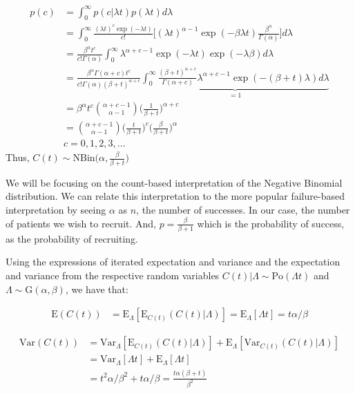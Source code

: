 \begin{align*}
p(c)&=\int^\infty_0 p(c|\lambda t) p(\lambda t) d\lambda\\
&=\int^\infty_0 \frac{(\lambda t)^c\exp(-\lambda t)}{c!}\Bigg[(\lambda t)^{\alpha-1}\exp(-\beta\lambda t)\frac{\beta^\alpha}{\Gamma(\alpha)}\Bigg]d\lambda\\
&=\frac{\beta^\alpha t^c}{c!\Gamma(\alpha)}\int^\infty_0 \lambda^{\alpha+c-1}\exp(-\lambda t)\exp(-\lambda\beta)d\lambda\\
&=\frac{\beta^\alpha\Gamma(\alpha+c) t^c}{c!\Gamma(\alpha) (\beta+t)^{\alpha+c}}\underbrace{\int^\infty_0 \frac{(\beta+t)^{\alpha+c}}{\Gamma(\alpha+c)} \lambda^{\alpha+c-1}\exp(-(\beta+t)\lambda)d\lambda}_{=1}\\
&=\beta^\alpha t^c\binom{\alpha+c-1}{\alpha-1}\Bigg (\frac{1}{\beta+t}\Bigg)^{\alpha+c}\\
&=\binom{\alpha+c-1}{\alpha-1}\Bigg (\frac{t}{\beta+t}\Bigg)^{c} \Bigg(\frac{\beta}{\beta+t}\Bigg)^{\alpha}\\
& c = 0,1,2,3,\ldots
\end{align*}
Thus, $C(t)\sim \textrm{NBin} \Bigg(\alpha, \frac{\beta}{\beta+t}\Bigg)$

We will be focusing on the count-based interpretation of the Negative Binomial distribution. We can relate this interpretation to the more popular failure-based interpretation by seeing $\alpha$ as $n$, the number of successes. In our case, the number of patients we wish to recruit. And, $p = \frac{\beta}{\beta+1}$ which is the probability of success, as the probability of recruiting.


Using the expressions of iterated expectation and variance \citep{held2014applied} and the expectation and variance from the respective random variables $C(t)|\Lambda \sim \textrm{Po}(\Lambda t)$ and $\Lambda \sim \textrm{G}(\alpha,\beta)$, we have that:


\begin{align*}
\textrm{E}(C(t)) &= \textrm{E}_{\Lambda}[\textrm{E}_{C(t)} (C(t)|\Lambda)] = \textrm{E}_{\Lambda}[\Lambda t] = t\alpha/\beta
\end{align*}

\begin{align*}
\textrm{Var}(C(t)) &= \textrm{Var}_{\Lambda}[\textrm{E}_{C(t)} (C(t)|\Lambda)] + \textrm{E}_{\Lambda}[\textrm{Var}_{C(t)}(C(t)|\Lambda)]\\
&=\textrm{Var}_{\Lambda}[\Lambda t] + \textrm{E}_{\Lambda}[\Lambda t] \\
&=t^2\alpha/\beta^2 + t\alpha/\beta = \frac{t\alpha(\beta+t)}{\beta^2}
\end{align*}

